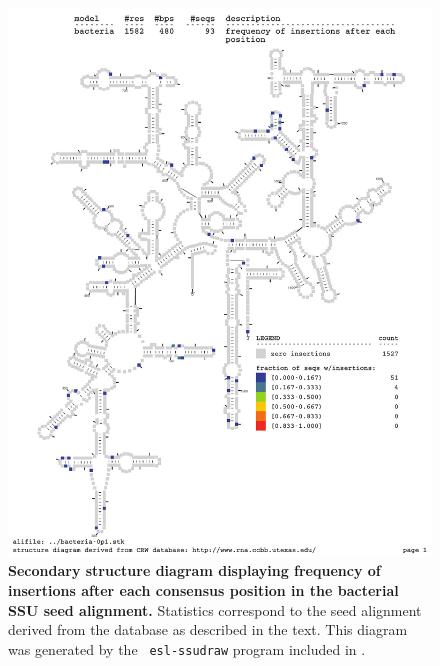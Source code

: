 \begin{figure}
\begin{center}
\includegraphics[width=5.5in]{../../seeds/ss-diagrams/bacteria-0p1-ins}
\end{center}
\caption[Secondary structure diagram displaying frequency of insertions
  after each consensus position in the bacterial SSU seed
  alignment]{\textbf{Secondary structure diagram displaying frequency
  of insertions after each consensus position in the bacterial SSU seed
  alignment.} Statistics correspond to the  seed
  alignment derived from the  database \cite{CannoneGutell02}
  as described in the text. This diagram was generated by the {\tt
  esl-ssudraw} program included in .}
\label{fig:bacins}
\end{figure}




